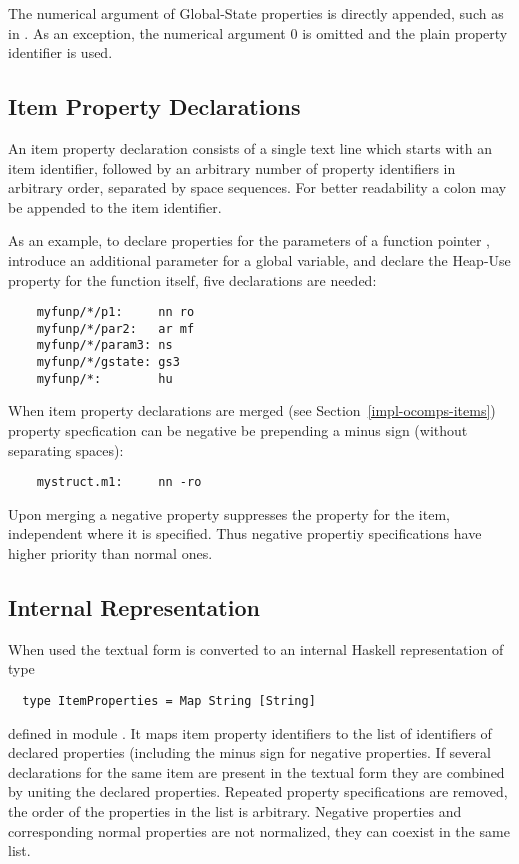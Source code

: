 The numerical argument of Global-State properties is directly appended, such as in . As an exception,
the numerical argument 0 is omitted and the plain property identifier  is used.

\subsection{Item Property Declarations}
\label{impl-itemprops-decl}

An item property declaration consists of a single text line which starts with an item identifier, followed
by an arbitrary number of property identifiers in arbitrary order, separated by space sequences.
For better readability a colon may be appended to the item identifier.

As an example, to declare properties for the parameters  of a function pointer ,
introduce an additional parameter for a global variable, and declare the Heap-Use property for the function itself, 
five declarations are needed:
\begin{verbatim}
    myfunp/*/p1:     nn ro
    myfunp/*/par2:   ar mf
    myfunp/*/param3: ns
    myfunp/*/gstate: gs3
    myfunp/*:        hu
\end{verbatim}

When item property declarations are merged (see Section~\ref{impl-ocomps-items}) property specfication can be negative
be prepending a minus sign \code{-} (without separating spaces):
\begin{verbatim}
    mystruct.m1:     nn -ro
\end{verbatim}
Upon merging a negative property suppresses the property for the item, independent where it is specified. Thus negative
propertiy specifications have higher priority than normal ones.

\subsection{Internal Representation}
\label{impl-itemprops-internal}

When used the textual form is converted to an internal Haskell representation of type 
\begin{verbatim}
  type ItemProperties = Map String [String]
\end{verbatim}
defined in module . It maps item property identifiers to the list of identifiers of 
declared properties (including the minus sign for negative properties.
If several declarations for the same item are present in the textual form they are combined by uniting the 
declared properties. Repeated property specifications are removed, the order of the properties in the list is
arbitrary. Negative properties and corresponding normal properties are not normalized, they can coexist in the
same list.

